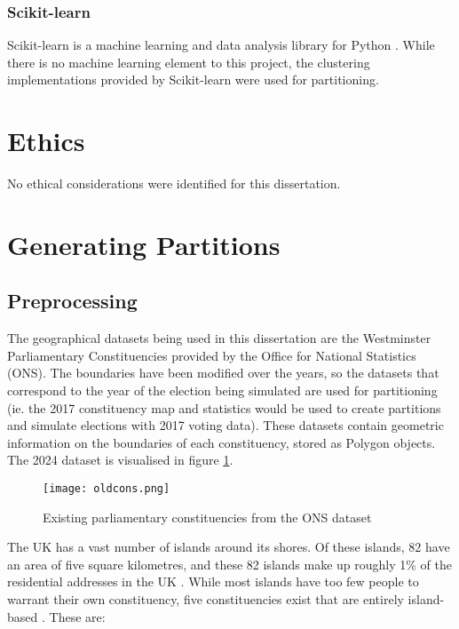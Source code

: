 \documentclass{article}
\begin{document}
\subsubsection{Scikit-learn}
Scikit-learn is a machine learning and data analysis library for Python \cite{scikit-learn}. While there is no machine learning element to this project, the clustering implementations provided by Scikit-learn
were used for partitioning.

\section{Ethics}
No ethical considerations were identified for this dissertation.

\section{Generating Partitions}

\subsection{Preprocessing}

The geographical datasets being used in this dissertation are the Westminster Parliamentary Constituencies provided by the Office for National Statistics (ONS). The boundaries have been modified
over the years, so the datasets that correspond to the year of the election being simulated are used for partitioning (ie. the 2017 constituency map and statistics would be used to create partitions
and simulate elections with 2017 voting data). These datasets contain geometric information on the boundaries of each constituency, stored as Polygon objects. The 2024 dataset is visualised in 
figure \ref{fig:oldcons}.

\begin{figure}[h]
    \centering
    \texttt{[image: oldcons.png]}
    \caption{Existing parliamentary constituencies from the ONS dataset}
    \label{fig:oldcons}
\end{figure}

The UK has a vast number of islands around its shores. Of these islands, 82 have an area of five square kilometres, and these 82 islands make up roughly 1\% of the 
residential addresses in the UK \cite{bbcislands}. While most islands have too few people to warrant their own constituency, five constituencies exist that are entirely island-based \cite{votes2024}. 
These are:
\end{document}

